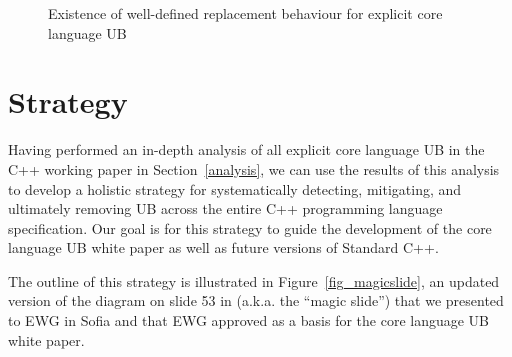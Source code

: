 \vspace{5mm} %
\begin{figure}[t!]
    \centering
    \caption{Existence of well-defined replacement behaviour for explicit core language UB}
    \label{piechart_replacement}
\end{figure}


\section{Strategy}
\label{strategy}

Having performed an in-depth analysis of all explicit core language UB in the C++ working paper in Section~\ref{analysis}, we can use the results of this analysis to develop a holistic strategy for systematically detecting, mitigating, and ultimately removing UB across the entire C++ programming language specification. Our goal is for this strategy to guide the development of the core language UB white paper \cite{P3656R1} as well as future versions of Standard C++.

The outline of this strategy is illustrated in Figure~\ref{fig_magicslide}, an updated version of the diagram on slide 53 in \cite{P3754R0} (a.k.a. the ``magic slide'') that we presented to EWG in Sofia and that EWG approved as a basis for the core language UB white paper.


